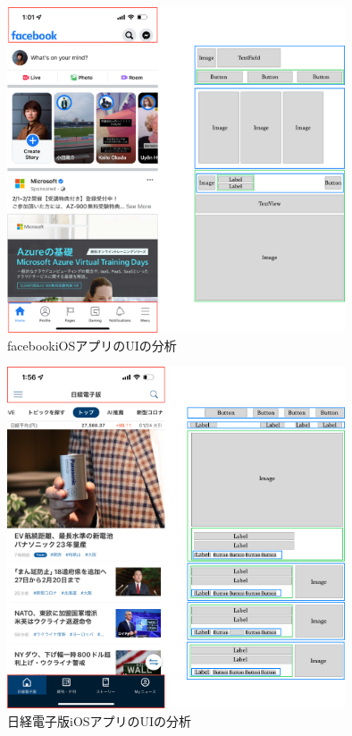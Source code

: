 \begin{figure}[htbp]
  \begin{minipage}{\hsize}
    \begin{center}
       \includegraphics[width=100mm]{img/facebook_analyze.png}
    \end{center}
    \caption{facebookiOSアプリのUIの分析}
    \label{fig:facebook_analyze}
  \end{minipage}
\end{figure}

\begin{figure}[htbp]
  \begin{minipage}{\hsize}
    \begin{center}
       \includegraphics[width=100mm]{img/nikkei_analyze.png}
    \end{center}
    \caption{日経電子版iOSアプリのUIの分析}
    \label{fig:nikkei_analyze}
  \end{minipage}
\end{figure}

